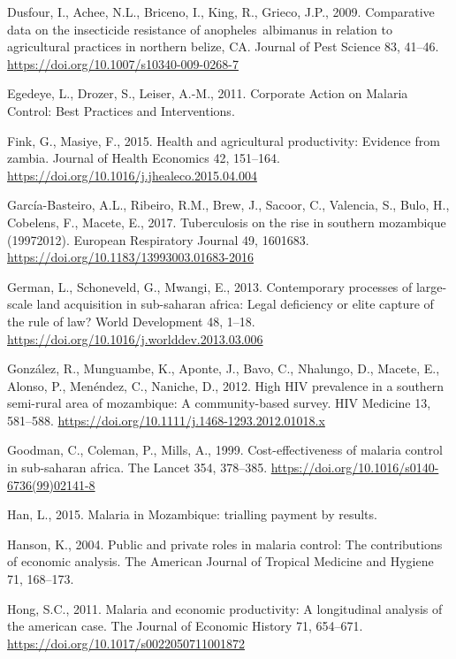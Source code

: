 \documentclass[]{article}
\begin{document}
\hypertarget{ref-Dusfour2009}{}
Dusfour, I., Achee, N.L., Briceno, I., King, R., Grieco, J.P., 2009.
Comparative data on the insecticide resistance of anopheles~albimanus in
relation to agricultural practices in northern belize, CA. Journal of
Pest Science 83, 41--46. \url{https://doi.org/10.1007/s10340-009-0268-7}

\hypertarget{ref-lafarge}{}
Egedeye, L., Drozer, S., Leiser, A.-M., 2011. Corporate Action on
Malaria Control: Best Practices and Interventions.

\hypertarget{ref-Fink2015}{}
Fink, G., Masiye, F., 2015. Health and agricultural productivity:
Evidence from zambia. Journal of Health Economics 42, 151--164.
\url{https://doi.org/10.1016/j.jhealeco.2015.04.004}

\hypertarget{ref-GarcaBasteiro2017}{}
García-Basteiro, A.L., Ribeiro, R.M., Brew, J., Sacoor, C., Valencia,
S., Bulo, H., Cobelens, F., Macete, E., 2017. Tuberculosis on the rise
in southern mozambique (19972012). European Respiratory Journal 49,
1601683. \url{https://doi.org/10.1183/13993003.01683-2016}

\hypertarget{ref-German2013}{}
German, L., Schoneveld, G., Mwangi, E., 2013. Contemporary processes of
large-scale land acquisition in sub-saharan africa: Legal deficiency or
elite capture of the rule of law? World Development 48, 1--18.
\url{https://doi.org/10.1016/j.worlddev.2013.03.006}

\hypertarget{ref-Gonzlez2012}{}
González, R., Munguambe, K., Aponte, J., Bavo, C., Nhalungo, D., Macete,
E., Alonso, P., Menéndez, C., Naniche, D., 2012. High HIV prevalence in
a southern semi-rural area of mozambique: A community-based survey. HIV
Medicine 13, 581--588.
\url{https://doi.org/10.1111/j.1468-1293.2012.01018.x}

\hypertarget{ref-Goodman1999}{}
Goodman, C., Coleman, P., Mills, A., 1999. Cost-effectiveness of malaria
control in sub-saharan africa. The Lancet 354, 378--385.
\url{https://doi.org/10.1016/s0140-6736(99)02141-8}

\hypertarget{ref-Han}{}
Han, L., 2015. Malaria in Mozambique: trialling payment by results.

\hypertarget{ref-Hanson2004}{}
Hanson, K., 2004. Public and private roles in malaria control: The
contributions of economic analysis. The American Journal of Tropical
Medicine and Hygiene 71, 168--173.

\hypertarget{ref-Hong2011}{}
Hong, S.C., 2011. Malaria and economic productivity: A longitudinal
analysis of the american case. The Journal of Economic History 71,
654--671. \url{https://doi.org/10.1017/s0022050711001872}
\end{document}
